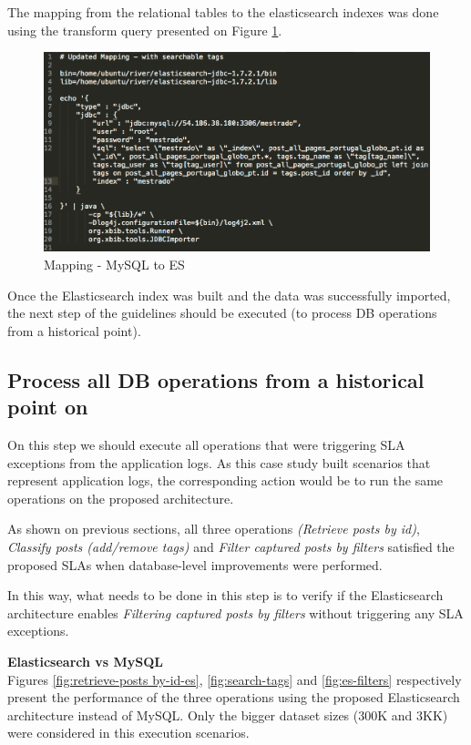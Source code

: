 The mapping from the relational tables to the elasticsearch indexes was done using the transform query presented on Figure \ref{fig:mysql-to-es}.

\begin{figure}[ht!]
	\centering
	\includegraphics[width=120mm]{Imagens/mysqlToES.png}
	\caption{Mapping - MySQL to ES \label{fig:mysql-to-es}}
\end{figure}

Once the Elasticsearch index was built and the data was successfully imported, the next step of the guidelines should be executed (to process DB operations from a historical point).


\subsection{Process all DB operations from a historical point on}

On this step we should execute all operations that were triggering SLA exceptions from the application logs. As this case study built scenarios that represent application logs, the corresponding action would be to run the same operations on the proposed architecture. 

As shown on previous sections, all three operations \textit{(Retrieve posts by id)}, \textit{Classify posts (add/remove tags)} and \textit{Filter captured posts by filters}
satisfied the proposed SLAs when database-level improvements were performed. 

In this way, what needs to be done in this step is to verify if the Elasticsearch architecture enables \textit{Filtering captured posts by filters} without triggering any SLA exceptions.

\noindent \textbf{Elasticsearch vs MySQL \\}
Figures \ref{fig:retrieve-posts by-id-es}, \ref{fig:search-tags} and \ref{fig:es-filters} respectively present the performance of the three operations using the proposed Elasticsearch architecture instead of MySQL. Only the bigger dataset sizes (300K and 3KK) were considered in this execution scenarios.


